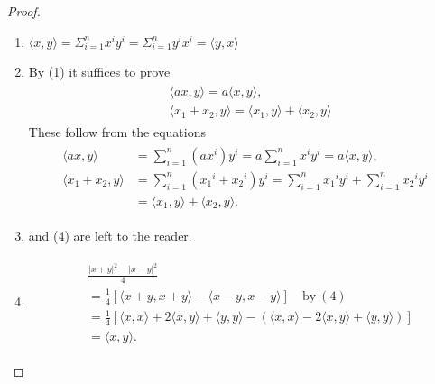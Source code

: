 \begin{proof}
    \begin{enumerate}[label={\upshape(\arabic*)}]
        \item $\langle x,y\rangle=\Sigma_{i=1}^{n}x^{i}y^{i}=\Sigma_{i=1}^{n}y^{i}x^{i}=\langle y,x\rangle $
        \item By (1) it suffices to prove
            \begin{align*}\begin{aligned}
                & \langle ax,y\rangle = {a\langle x,y\rangle,}\\
                & \langle x_{1}+x_{2}, y\rangle = \langle x_{1},y\rangle+\langle x_{2},y\rangle
            \end{aligned}\end{align*}
            These follow from the equations
            \begin{align*}\begin{aligned}
                \langle ax,y\rangle
                    & =\sum_{i=1}^{n}(ax^{i})y^{i}
                        = a\sum_{i=1}^{n}x^{i}y^{i}=a\langle x,y\rangle,\\
                \langle x_{1}+x_{2},y\rangle
                    & =\sum_{i=1}^{n}(x_{1}{}^{i}+x_{2}{}^{i})y^{i}
                        = \sum_{i=1}^{n}x_{1}{}^{i}y^{i}+\sum_{i=1}^{n}x_{2}{}^{i}y^{i} \\
                    & = \langle x_{1},y\rangle+\langle x_{2},y\rangle.
            \end{aligned}\end{align*}
        \item and (4) are left to the reader.
        \item \quad \vspace*{-2em}
            \begin{align*}\begin{aligned}
                & \frac{|x+y|^2-|x-y|^2}4 \\
                & = \frac14[\langle x+y,x+y\rangle-\langle x-y,x-y\rangle]\quad\mathrm{by~}(4) \\
                & = \frac14[\langle x,x\rangle+2\langle x,y\rangle+\langle y,y\rangle-(\langle x,x\rangle-2\langle x,y\rangle+\langle y,y\rangle)] \\
                & = \langle x,y\rangle.
            \end{aligned}\end{align*}
    \end{enumerate}
\end{proof}

